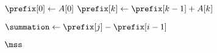 
\begin{algorithm}[H]
  \begin{algorithmic}[1]
      \State $\prefix[0] \gets A[0]$
        \State $\prefix[k] \gets \prefix[k-1] + A[k]$
      \EndFor
    
      \hStatex
      \State {}

      \hStatex
          \State $\summation \gets \prefix[j] - \prefix[i-1]$
          \State \red{$\mss \gets \max \set{\mss, \summation}$}
        \EndFor
      \EndFor

      \hStatex 
      \State \Return $\mss$
    \EndProcedure
  \end{algorithmic}
\end{algorithm}